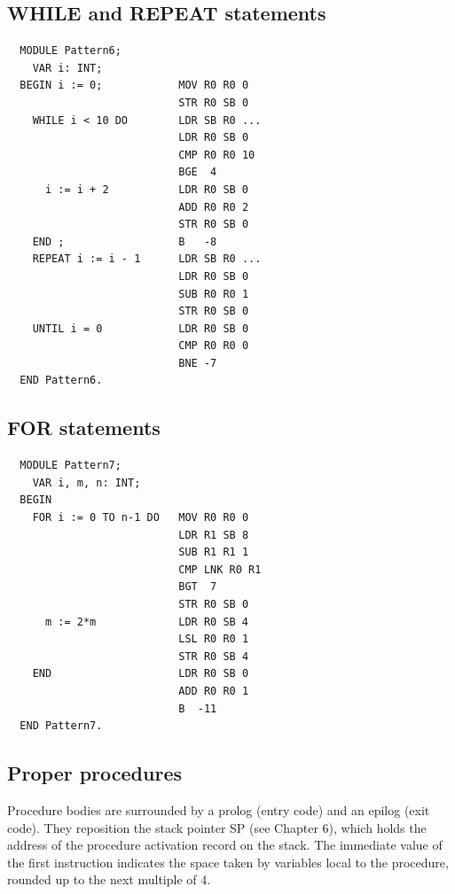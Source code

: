 \subsection{WHILE and REPEAT statements}
\begin{verbatim}
  MODULE Pattern6;
    VAR i: INT;
  BEGIN i := 0;            MOV R0 R0 0   
                           STR R0 SB 0
    WHILE i < 10 DO        LDR SB R0 ...
                           LDR R0 SB 0
                           CMP R0 R0 10
                           BGE  4
      i := i + 2           LDR R0 SB 0
                           ADD R0 R0 2
                           STR R0 SB 0
    END ;                  B   -8
    REPEAT i := i - 1      LDR SB R0 ...
                           LDR R0 SB 0
                           SUB R0 R0 1
                           STR R0 SB 0
    UNTIL i = 0            LDR R0 SB 0
                           CMP R0 R0 0
                           BNE -7
  END Pattern6.
\end{verbatim}

\subsection{FOR statements}
\label{ssc:ptn7}
\begin{verbatim}
  MODULE Pattern7;
    VAR i, m, n: INT;
  BEGIN
    FOR i := 0 TO n-1 DO   MOV R0 R0 0   
                           LDR R1 SB 8
                           SUB R1 R1 1
                           CMP LNK R0 R1
                           BGT  7
                           STR R0 SB 0
      m := 2*m             LDR R0 SB 4
                           LSL R0 R0 1
                           STR R0 SB 4
    END                    LDR R0 SB 0
                           ADD R0 R0 1
                           B  -11
  END Pattern7.
\end{verbatim}

\subsection{Proper procedures}
Procedure bodies are surrounded by a prolog (entry code) and an epilog (exit code). They reposition
the stack pointer SP (see Chapter 6), which holds the address of the procedure activation record on
the stack. The immediate value of the first instruction indicates the space taken by variables local
to the procedure, rounded up to the next multiple of 4.


